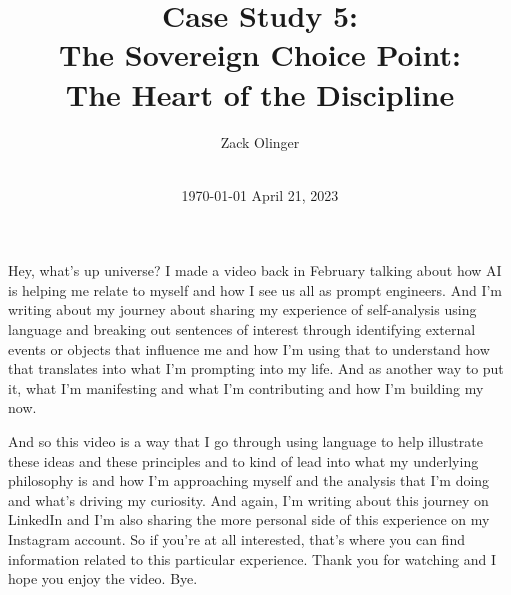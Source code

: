 \documentclass{article}
\newcommand{\docTitle}{Case Study 5: \\The Sovereign Choice Point: \\The Heart of the Discipline}
\newcommand{\docAuthor}{Zack Olinger}
\newcommand{\docVersion}{\csSovereignChoicePointVersion}
\begin{document}
\pagestyle{plain}

\begin{titlepage}
    \title{\docTitle}
    \author{\docAuthor}
    \date{
        \docVersion \\
        \vspace{1em}
        \today
    }
    \maketitle
    \thispagestyle{empty}

    \begin{abstract}
        \csSovereignChoicePointAbstract
    \end{abstract}

\end{titlepage}

\licensepage

\label{LastFrontMatterPage}
\cleardoublepage
{}

\pagestyle{mainbody}



\date{April 21, 2023}

Hey, what's up universe? I made a video back in February talking about how AI is helping me
relate to myself and how I see us all as prompt engineers. And I'm writing about my journey
about sharing my experience of self-analysis using language and breaking out sentences of
interest through identifying external events or objects that influence me and how I'm using that
to understand how that translates into what I'm prompting into my life. And as another way to
put it, what I'm manifesting and what I'm contributing and how I'm building my now.

And so this video is a way that I go through using language to help illustrate these ideas
and these principles and to kind of lead into what my underlying philosophy is
and how I'm approaching myself and the analysis that I'm doing and what's driving my curiosity.
And again, I'm writing about this journey on LinkedIn and I'm also sharing the more personal
side of this experience on my Instagram account. So if you're at all interested, that's where you can find information related to this particular experience. Thank you for watching and I hope you enjoy the video. Bye. 
\end{document}
